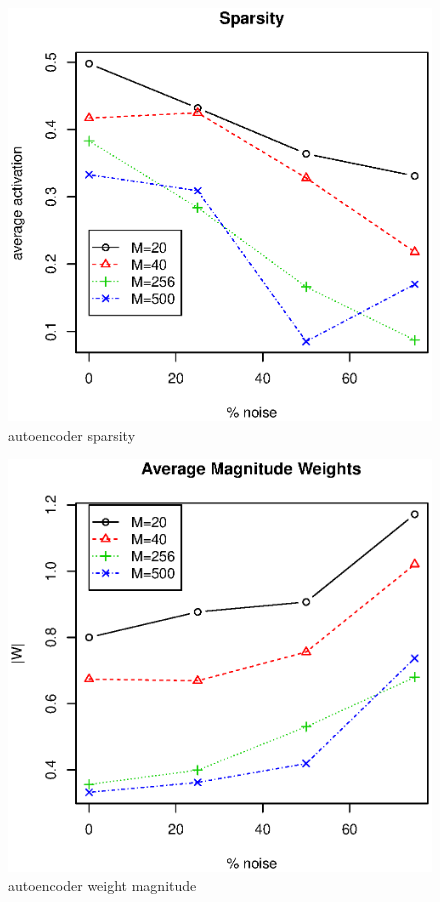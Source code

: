 %
\begin{figure}
\begin{center}
\includegraphics[width=6in]{04ANNDeep/aeSparsityMNoise01.eps}
\end{center}
\caption{autoencoder sparsity}
\label{fig: deep autoencoder sparsity}
\end{figure}
%

%
\begin{figure}
\begin{center}
\includegraphics[width=6in]{04ANNDeep/aeWbyMNoise01.eps}
\end{center}
\caption{autoencoder weight magnitude}
\label{fig: deep autoencoder weight magnitude}
\end{figure}
%

